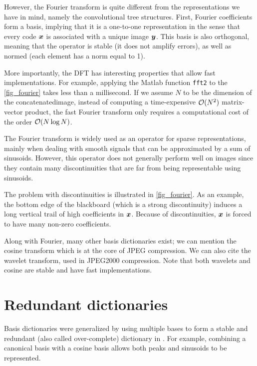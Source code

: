 \noindent
However, the Fourier transform is quite different from the representations we have in mind, namely the convolutional tree structures. First, Fourier coefficients form a basis, implying that it is a one-to-one representation in the sense that every code $\bm{x}$ is associated with a unique image $\bm{y}$. This basis is also orthogonal, meaning that the operator is stable (it does not amplify errors), as well as normed (each element has a norm equal to 1).

\noindent
More importantly, the \ac{DFT} has interesting properties that allow fast implementations. For example, applying the Matlab function \texttt{fft2} to the \cref{fig_fourier} takes less than a millisecond. If we assume $N$ to be the dimension of the concatenated\footnotemark[2] image, instead of computing a time-expensive $\mathcal{O}(N^2)$ matrix-vector product, the fast Fourier transform only requires a computational cost of the order $\mathcal{O}(N \log N)$.


\noindent
The Fourier transform is widely used as an operator for sparse representations, mainly when dealing with smooth signals that can be approximated by a sum of sinusoids. However, this operator does not generally perform well on images since they contain many discontinuities that are far from being representable using sinusoids.

\noindent
The problem with discontinuities is illustrated in \cref{fig_fourier}. As an example, the bottom edge of the blackboard (which is a strong discontinuity) induces a long vertical trail of high coefficients in $\bm{x}$. Because of discontinuities, $\bm{x}$ is forced to have many non-zero coefficients. 

\noindent
Along with Fourier, many other basis dictionaries exist; we can mention the cosine transform which is at the core of JPEG compression. We can also cite the wavelet transform, used in JPEG2000 compression. Note that both wavelets and cosine are stable and have fast implementations.

\section{Redundant dictionaries}

Basis dictionaries were generalized by using multiple bases to form a stable and redundant (also called over-complete) dictionary in \cite{shaobing_chen_atomic_2001}. For example, combining a canonical basis with a cosine basis allows both peaks and sinusoids to be represented.

